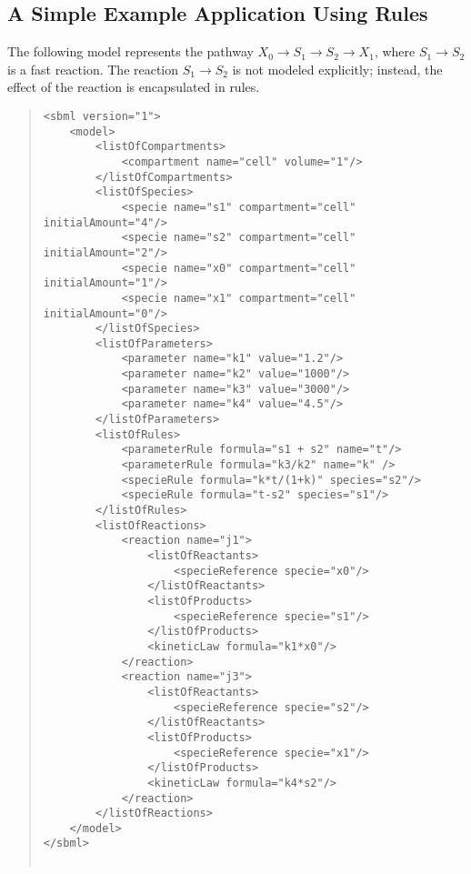 \documentclass[10pt]{cek-article}
\begin{document}
\subsection{A Simple Example Application Using Rules}
\label{subsection:ruleseg}

The following model represents the pathway $X_0 \rightarrow S_1 \rightarrow
S_2 \rightarrow X_1$, where $S_1 \rightarrow S_2$ is a fast reaction.  The
reaction $S_1 \rightarrow S_2$ is not modeled explicitly; instead, the
effect of the reaction is encapsulated in rules.
\begin{quote}
\begin{small}
\tightspacing
\begin{verbatim}
<sbml version="1">
    <model>
        <listOfCompartments>
            <compartment name="cell" volume="1"/>
        </listOfCompartments>
        <listOfSpecies>
            <specie name="s1" compartment="cell" initialAmount="4"/>
            <specie name="s2" compartment="cell" initialAmount="2"/>
            <specie name="x0" compartment="cell" initialAmount="1"/>
            <specie name="x1" compartment="cell" initialAmount="0"/>
        </listOfSpecies>
        <listOfParameters>
            <parameter name="k1" value="1.2"/>
            <parameter name="k2" value="1000"/>
            <parameter name="k3" value="3000"/>
            <parameter name="k4" value="4.5"/>
        </listOfParameters>
        <listOfRules>
            <parameterRule formula="s1 + s2" name="t"/>
            <parameterRule formula="k3/k2" name="k" />
            <specieRule formula="k*t/(1+k)" species="s2"/>
            <specieRule formula="t-s2" species="s1"/>
        </listOfRules>
        <listOfReactions>
            <reaction name="j1">
                <listOfReactants>
                    <specieReference specie="x0"/>
                </listOfReactants>
                <listOfProducts>
                    <specieReference specie="s1"/>
                </listOfProducts>
                <kineticLaw formula="k1*x0"/>
            </reaction>
            <reaction name="j3">
                <listOfReactants>
                    <specieReference specie="s2"/>
                </listOfReactants>
                <listOfProducts>
                    <specieReference specie="x1"/>
                </listOfProducts>
                <kineticLaw formula="k4*s2"/>
            </reaction>
        </listOfReactions>
    </model>
</sbml>


\end{verbatim}
  \regularspacing
\end{small}
\end{quote}
\end{document}
